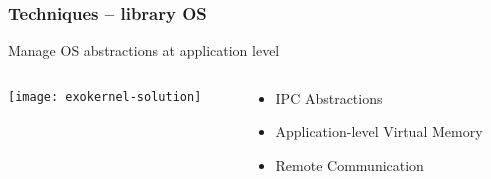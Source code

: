 \begin{frame}[plain]
	\frametitle{Techniques -- library OS}
	
	\Large
	Manage OS abstractions 	at application level
	
	\begin{columns}
		
		\begin{column}{.5\textwidth}
			
			\texttt{[image: exokernel-solution]}
			
		\end{column}
		
		\begin{column}{.5\textwidth}
			
			\large
			\begin{itemize}
				\item IPC Abstractions
			
				\item Application-level Virtual Memory
					
				\item Remote Communication
				
			\end{itemize}
		\end{column}
		
		
	\end{columns}
	
\end{frame}



